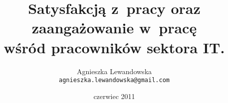 \documentclass[a4paper,12pt,titlepage]{article}
\begin{document}
\title{\Large Satysfakcją z~pracy oraz zaangażowanie w~pracę \\ wśród pracowników sektora IT.}
\author{\Large{Agnieszka Lewandowska} \\ \texttt{agnieszka.lewandowska@gmail.com} }
\date{czerwiec 2011}
\maketitle


\tableofcontents
\cleardoublepage







\graphicspath{{img/group/}}

\graphicspath{{img/results/}}



\cleardoublepage


\cleardoublepage
{}


\end{document}
